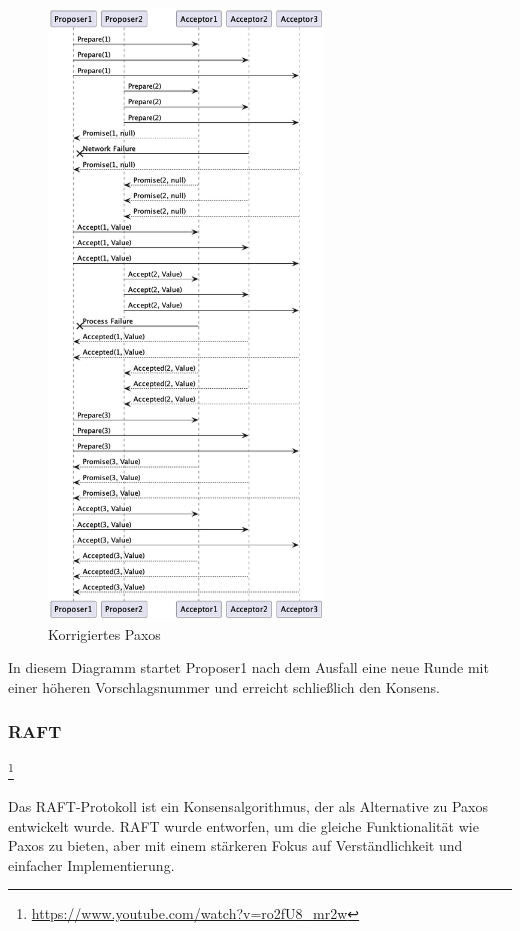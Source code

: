 \begin{figure}[!htp]
  \centering
  \includegraphics[width=0.65\textwidth]{fig/uml/paxos-issue-solve}
  \caption{Korrigiertes Paxos}
  \label{fig:simple-paxos-solve}
\end{figure}

In diesem Diagramm startet Proposer1 nach dem Ausfall eine neue Runde mit einer höheren Vorschlagsnummer und erreicht schließlich den Konsens.



\subsubsection{RAFT}\footnote{\url{https://www.youtube.com/watch?v=ro2fU8_mr2w}}

Das RAFT-Protokoll ist ein Konsensalgorithmus, der als Alternative zu Paxos entwickelt wurde. RAFT wurde entworfen, um die gleiche Funktionalität wie Paxos zu bieten, aber mit einem stärkeren Fokus auf Verständlichkeit und einfacher Implementierung.

